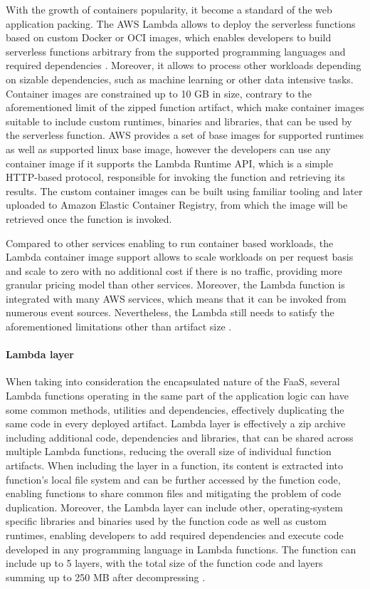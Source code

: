 With the growth of containers popularity, it become a standard of the web application packing. The AWS Lambda allows to deploy the serverless functions based on custom Docker or OCI images, which enables developers to build serverless functions arbitrary from the supported programming languages and required dependencies \cite{AWSLambdaContainerImage}. Moreover, it allows to process other workloads depending on sizable dependencies, such as machine learning or other data intensive tasks.
Container images are constrained up to 10 GB in size, contrary to the aforementioned limit of the zipped function artifact, which make container images suitable to include custom runtimes, binaries and libraries, that can be used by the serverless function.
AWS provides a set of base images for supported runtimes as well as supported linux base image, however the developers can use any container image if it supports the Lambda Runtime API, which is a simple HTTP-based protocol, responsible for invoking the function and retrieving its results.
The custom container images can be built using familiar tooling and later uploaded to Amazon Elastic Container Registry, from which the image will be retrieved once the function is invoked.

Compared to other services enabling to run container based workloads, the Lambda container image support allows to scale workloads on per request basis and scale to zero with no additional cost if there is no traffic, providing more granular pricing model than other services. Moreover, the Lambda function is integrated with many AWS services, which means that it can be invoked from numerous event sources. 
Nevertheless, the Lambda still needs to satisfy the aforementioned limitations other than artifact size \cite{RunningContainerImagesInAWSLambda}.

\paragraph{Lambda layer}

When taking into consideration the encapsulated nature of the FaaS, several Lambda functions operating in the same part of the application logic can have some common methods, utilities and dependencies, effectively duplicating the same code in every deployed artifact.
Lambda layer is effectively a zip archive including additional code, dependencies and libraries, that can be shared across multiple Lambda functions, reducing the overall size of individual function artifacts.
When including the layer in a function, its content is extracted into function's local file system and can be further accessed by the function code, enabling functions to share common files and mitigating the problem of code duplication.
Moreover, the Lambda layer can include other, operating-system specific libraries and binaries used by the function code as well as custom runtimes, enabling developers to add required dependencies and execute code developed in any programming language in Lambda functions.
The function can include up to 5 layers, with the total size of the function code and layers summing up to 250 MB after decompressing \cite{AWSLambdaLayer}.

